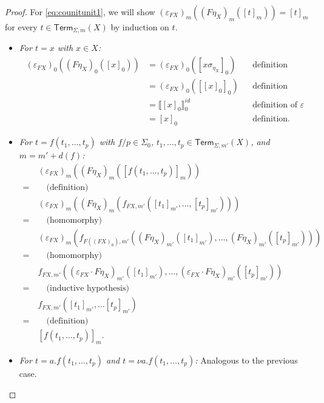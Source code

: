 \documentclass[a4paper,UKenglish,cleveref,thm-restate,numberwithinsect,final]{lipics-v2021}
\newcommand{\Term}{\mathsf{Term}}
\newcommand{\sig}{\Sigma}
\newcommand{\sigp}{\Sigma_0}
\theoremstyle{plain}
\newcommand{\id}{\mathit{id}}
\numberwithin{equation}{section}
\newcommand{\+}[1]{\mathcal{#1}\xspace}
\theoremstyle{definition}
\begin{document}
\begin{proof}
    For \eqref{eq:counitunit1}, we will show \((\varepsilon_{FX})_m((F\eta_X)_m([t]_m)) = [t]_m\) for every \(t \in \Term_{\sig, m}(X)\) by induction on \(t\).
    \begin{itemize}
        \item
            \textit{For \(t = x\) with \(x \in X\):}
            \begin{align*}
                (\varepsilon_{FX})_0((F\eta_X)_0([x]_0))
                &= (\varepsilon_{FX})_0([x\sigma_{\eta_X}]_0) && \text{definition} \\
                &= (\varepsilon_{FX})_0([[x]_0]_0) && \text{definition} \\
                &= \llbracket [x]_0 \rrbracket^{\id}_0 && \text{definition of } \varepsilon \\
                &= [x]_0 && \text{definition}.
            \end{align*}
        \item
            \textit{For \(t = f(t_1, \ldots, t_p)\) with \(f/p \in \sigp\), \(t_1, \ldots, t_p \in \Term_{\sig, m'}(X)\), and \(m = m' + d(f)\):}
            \begin{align*}
                &(\varepsilon_{FX})_m((F\eta_X)_m([f(t_1, \ldots, t_p)]_m)) \\
                =~&\quad\text{(definition)} \\
                &(\varepsilon_{FX})_m((F\eta_X)_m(f_{FX, m'}([t_1]_{m'}, \ldots, [t_p]_{m'}))) \\
                =~&\quad\text{(homomorphy)} \\
                &(\varepsilon_{FX})_m(f_{F((FX)_0), m'}((F\eta_X)_{m'}([t_1]_{m'}), \ldots, (F\eta_X)_{m'}([t_p]_{m'}))) \\
                =~&\quad\text{(homomorphy)} \\
                &f_{FX, m'}((\varepsilon_{FX} \cdot F\eta_X)_{m'}([t_1]_{m'}), \ldots, (\varepsilon_{FX} \cdot F\eta_X)_{m'}([t_p]_{m'})) \\
                =~&\quad\text{(inductive hypothesis)} \\
                &f_{FX, m'}([t_1]_{m'}, \ldots [t_p]_{m'}) \\
                =~&\quad\text{(definition)} \\
                &[f(t_1, \ldots, t_p)]_m.
            \end{align*}
        \item
            \textit{For \(t = a.f(t_1, \ldots, t_p)\) and \(t = \nu a.f(t_1, \ldots, t_p)\):}
            Analogous to the previous case.
    \end{itemize}


\end{proof}
\end{document}
